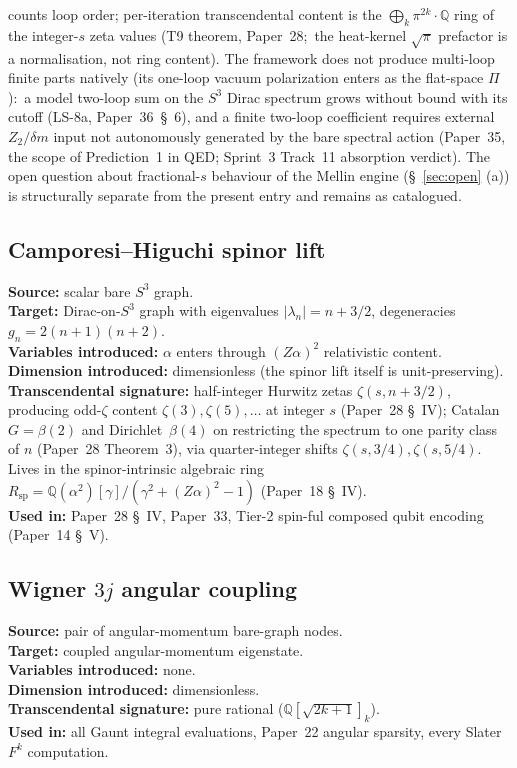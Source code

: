 \documentclass[11pt]{article}
\begin{document}
counts loop order; per-iteration transcendental content is the
$\bigoplus_k \pi^{2k}\cdot\mathbb{Q}$ ring of the integer-$s$ zeta values
(T9 theorem, Paper~28;\ the heat-kernel $\sqrt{\pi}$ prefactor is a
normalisation, not ring content).
The framework does not produce multi-loop finite parts natively (its
one-loop vacuum polarization enters as the flat-space $\Pi$):\ a model two-loop sum on the $S^3$ Dirac spectrum grows without
bound with its cutoff (LS-8a, Paper~36~\S~6), and a finite two-loop
coefficient requires external $Z_2/\delta m$ input not
autonomously generated by the bare spectral action (Paper~35, the
scope of Prediction~1 in QED; Sprint~3 Track~11 absorption verdict).  The open
question about fractional-$s$ behaviour of the Mellin engine
(\S~\ref{sec:open} (a)) is structurally separate from the present
entry and remains as catalogued.

\subsection{Camporesi--Higuchi spinor lift}
\label{sec:proj_spinor}
\textbf{Source:} scalar bare $S^3$ graph.\\
\textbf{Target:} Dirac-on-$S^3$ graph with eigenvalues
$|\lambda_n| = n + 3/2$, degeneracies $g_n = 2(n{+}1)(n{+}2)$.\\
\textbf{Variables introduced:} $\alpha$ enters through $(Z\alpha)^2$
relativistic content.\\
\textbf{Dimension introduced:} dimensionless (the spinor lift itself
is unit-preserving).\\
\textbf{Transcendental signature:} half-integer Hurwitz zetas
$\zeta(s, n + 3/2)$, producing odd-$\zeta$ content $\zeta(3),
\zeta(5), \ldots$ at integer $s$ (Paper~28 \S~IV); Catalan~$G =
\beta(2)$ and Dirichlet~$\beta(4)$ on restricting the spectrum to one
parity class of $n$ (Paper~28 Theorem~3), via
quarter-integer shifts $\zeta(s, 3/4), \zeta(s, 5/4)$.  Lives in
the spinor-intrinsic algebraic ring $R_\text{sp} =
\mathbb{Q}(\alpha^2)[\gamma]/(\gamma^2 + (Z\alpha)^2 - 1)$
(Paper~18 \S~IV).\\
\textbf{Used in:} Paper~28 \S~IV, Paper~33, Tier-2 spin-ful composed
qubit encoding (Paper~14 \S~V).

\subsection{Wigner $3j$ angular coupling}
\label{sec:proj_3j}
\textbf{Source:} pair of angular-momentum bare-graph nodes.\\
\textbf{Target:} coupled angular-momentum eigenstate.\\
\textbf{Variables introduced:} none.\\
\textbf{Dimension introduced:} dimensionless.\\
\textbf{Transcendental signature:} pure rational
($\mathbb{Q}[\sqrt{2k+1}]_{k}$).\\
\textbf{Used in:} all Gaunt integral evaluations, Paper~22 angular
sparsity, every Slater $F^k$ computation.
\end{document}
